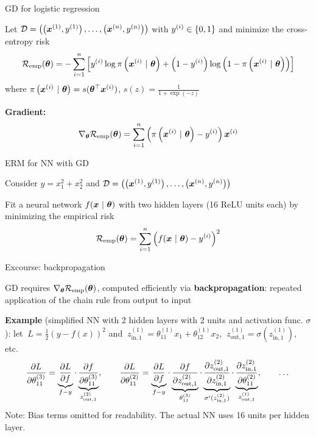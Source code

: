 \documentclass[11pt,compress,t,notes=noshow, xcolor=table]{beamer}
\newcommand{\zin}[2]{z_{\text{in},{#1}}^{(#2)}}
\newcommand{\zout}[2]{z_{\text{out},{#1}}^{(#2)}}
\begin{document}
\begin{framei}{GD for logistic regression}
\item Let $\mathcal{D} = \left( \left(\bm{x}^{(1)}, y^{(1)}\right), \ldots, \left(\bm{x}^{(n)}, y^{(n)}\right)\right)$ with $y^{(i)} \in \{0, 1\}$ and minimize the cross-entropy risk
$$\mathcal{R}_{\text{emp}}(\bm{\theta}) = - \sum\limits_{i=1}^n \left[y^{(i)} \log \pi\left(\bm{x}^{(i)} ~|~ \bm{\theta}\right) + \left(1 - y^{(i)}\right) \log\left(1 - \pi\left(\bm{x}^{(i)} ~|~ \bm{\theta}\right)\right)\right]$$
where $\pi\left(\bm{x}^{(i)} ~|~ \bm{\theta}\right) = s(\bm{\theta}^\top \bm{x}^{(i)})$, \quad $s(z) = \tfrac{1}{1 + \exp(-z)}$
\item \textbf{Gradient:}
$$\nabla_{\bm{\theta}} \mathcal{R}_{\text{emp}}(\bm{\theta}) = \sum\limits_{i=1}^n \left(\pi\left(\bm{x}^{(i)} ~|~ \bm{\theta}\right) - y^{(i)}\right) \bm{x}^{(i)}$$
\end{framei}


\begin{framei}{ERM for NN with GD}
\item Consider $y = x_1^2 + x_2^2$ and $\mathcal{D} = \left( \left(\bm{x}^{(1)}, y^{(1)}\right), \ldots, \left(\bm{x}^{(n)}, y^{(n)}\right)\right)$
\vspace{-0.75cm}
\item Fit a neural network $f(\bm{x} ~|~ \bm{\theta})$ with two hidden layers (16 ReLU units each) by minimizing the empirical risk
$$\mathcal{R}_{\text{emp}}(\bm{\theta}) = \sum\limits_{i=1}^n \left(f(\bm{x} ~|~ \bm{\theta}) - y^{(i)}\right)^2$$

\end{framei}


\begin{framei}[fs=footnotesize]{Excourse: backpropagation}
\item GD requires $\nabla_{\bm{\theta}} \mathcal{R}_{\text{emp}}(\bm{\theta})$, computed efficiently via \textbf{backpropagation}: repeated application of the chain rule from output to input
\item \textbf{Example} (simplified NN with 2 hidden layers with 2 units and activation func. $\sigma$):
let $\ L = \tfrac{1}{2}(y - f(x))^2$ and
$\ \zin{1}{1} = \theta_{11}^{(1)} x_1 + \theta_{12}^{(1)} x_2$,
$\ \zout{1}{1} = \sigma(\zin{1}{1})$, etc.
$$
\pd{L}{\theta_{11}^{(3)}} = \underbrace{\pd{L}{f}}_{f-y} \cdot \underbrace{\pd{f}{\theta_{11}^{(3)}}}_{{\zout{1}{2}}}, \qquad
\pd{L}{\theta_{11}^{(2)}} = \underbrace{\pd{L}{f}}_{f-y} \cdot \underbrace{\pd{f}{\zout{1}{2}}}_{\theta_{11}^{(3)}} \cdot \underbrace{\pd{\zout{1}{2}}{\zin{1}{2}}}_{\sigma'(\zin{1}{2})} \cdot \underbrace{\pd{\zin{1}{2}}{\theta_{11}^{(2)}}}_{\zout{1}{1}}, \qquad
\dots
$$
\vspace{-1cm}
{\scriptsize
Note: Bias terms omitted for readability. The actual NN uses 16 units per hidden layer.
}
\end{framei}
\end{document}
